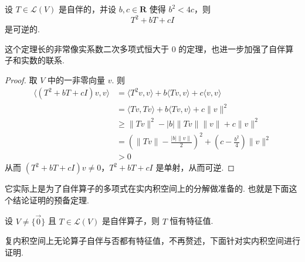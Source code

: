 \begin{theorem}
    设 $ T \in \mathcal{L}(V) $ 是自伴的，并设 $ b, c \in \mathbf{R} $ 
    使得 $ b^2 < 4c $，则 
    \[
        T^2 + bT + cI    
    \]
    是可逆的. 
\end{theorem}

这个定理长的非常像实系数二次多项式恒大于 0 的定理，也进一步加强了自伴算子和实数的联系. 

\begin{proof}
    取 $ V $ 中的一非零向量 $ v $. 则
    \begin{align*}
        \langle (T^2 + bT + cI)v, v \rangle 
        & = \langle T^2v, v \rangle + b\langle Tv, v \rangle + c\langle v, v \rangle \\
        & = \langle Tv, Tv \rangle +  b\langle Tv, v \rangle + c\lVert v \rVert^2 \\
        & \geqslant \lVert Tv \rVert^2 - \lvert b \rvert \lVert Tv \rVert \lVert v \rVert +  c\lVert v \rVert^2 \\
        & = \left(\lVert Tv \rVert - \frac{\lvert b \rvert \lVert v \rVert}{2}\right)^2
        + (c - \frac{b^2}{4})\lVert v \rVert^2 \\
        & > 0
    \end{align*}
    从而 $ (T^2 + bT + cI)v \neq 0 $，$ T^2 + bT + cI $ 是单射，从而可逆. 
\end{proof}

它实际上是为了自伴算子的多项式在实内积空间上的分解做准备的. 也就是下面这个结论证明的预备定理. 

\begin{theorem}
    设 $ V \neq \{ \vec{0} \} $ 且 $ T \in \mathcal{L}(V) $ 是自伴算子，则 
    $ T $ 恒有特征值.
\end{theorem}

复内积空间上无论算子自伴与否都有特征值，不再赘述，下面针对实内积空间进行证明. 

